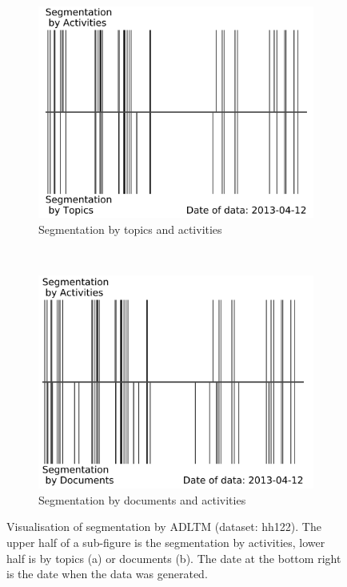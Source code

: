 \documentclass{article}
\begin{document}
\begin{figure}[!b]
\centering
\begin{subfigure}{0.48\linewidth}
    \includegraphics[width=\linewidth]{figures/adl_tm/act_topic_segs_sub1_bw_cp}
    \caption{Segmentation by topics and activities}
\end{subfigure} \ \ 
\begin{subfigure}{0.48\linewidth}
    \includegraphics[width=\linewidth]{figures/adl_tm/act_doc_segs_sub1_bw_cp}
    \caption{Segmentation by documents and activities}
\end{subfigure}
\caption{Visualisation of segmentation by \ac{ADLTM} (dataset: hh122). The upper half of a sub-figure is the segmentation by activities, lower half is by topics (a) or documents (b). The date at the bottom right is the date when the data was generated.}
\label{fig:visseg}
\end{figure}
\end{document}
